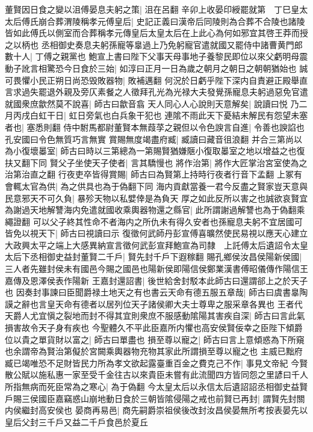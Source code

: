 董賢因日食之變以沮傅晏息夫躬之策|{
	沮在呂翻}
辛卯上收晏印綬罷就第　丁巳皇太太后傅氏崩合葬渭陵稱孝元傅皇后|{
	史記正義曰漢帝后同陵則為合葬不合陵也諸陵皆如此傅氏以側室而合葬稱孝元傳皇后太皇太后在上此心為何如邪宜其啓王莽而授之以柄也}
丞相御史奏息夫躬孫寵等辠過上乃免躬寵官遣就國又罷侍中諸曹黄門郎數十人|{
	丁傅之親黨也}
鮑宣上書曰陛下父事天母事地子養黎民即位以來父虧明母震動子訛言相驚恐今日食於三始|{
	如淳曰正月一日為歲之朝月之朝日之朝朝猶始也}
誠可畏懼小民正朔日尚恐毁敗器物|{
	敗補邁翻}
何況於日虧乎陛下深内自責避正殿舉直言求過失罷退外親及旁仄素餐之人徵拜孔光為光禄大夫發覺孫寵息夫躬過惡免官遣就國衆庶歙然莫不說喜|{
	師古曰歙音翕}
天人同心人心說則天意解矣|{
	說讀曰悦}
乃二月丙戌白虹干日|{
	虹日旁氣也白兵象干犯也}
連隂不雨此天下憂結未解民有怨望未塞者也|{
	塞悉則翻}
侍中駙馬都尉董賢本無葭莩之親但以令色諛言自進|{
	令善也諛諂也孔安國曰令色無質巧言無實}
賞賜無度竭盡府臧|{
	臧讀曰藏音徂浪翻}
并合三第尚以為小復壞㬥室|{
	師古曰時以三第總為一第賜賢猶嫌陿小復取㬥室之地以增益之也復扶又翻下同}
賢父子坐使天子使者|{
	言其驕慢也}
將作治第|{
	將作大匠掌治宮室使為之治第治直之翻}
行夜吏卒皆得賞賜|{
	師古曰為賢第上持時行夜者行音下孟翻}
上冢有會輒太官為供|{
	為之供具也為于偽翻下同}
海内貢獻當養一君今反盡之賢家豈天意與民意邪天不可久負|{
	暴殄天物以私嬖倖是為負天}
厚之如此反所以害之也誠欲哀賢宜為謝過天地解讐海内免遣就國收乘輿器物還之縣官|{
	此所謂謝過解讐也為于偽翻乘繩證翻}
可以父子終其性命不者海内之所仇未有得久安者也孫寵息夫躬不宜居國可皆免以視天下|{
	師古曰視讀曰示}
復徵何武師丹彭宣傅喜曠然使民易視以應天心建立大政興太平之端上大感異納宣言徵何武彭宣拜鮑宣為司隸　上託傅太后遺詔令太皇太后下丞相御史益封董賢二千戶|{
	賢先封千戶下遐稼翻}
賜孔鄉侯汝昌侯陽新侯國|{
	三人者先雖封侯未有國邑今賜之國邑也陽新侯即陽信侯鄭業漢書傅昭儀傳作陽信王嘉傳及恩澤侯表作陽新}
王嘉封還詔書|{
	後世給舍封駁本此師古曰還謂郤上之於天子也}
因奏封事諫曰臣聞爵禄土地天之有也書云天命有德五服五章哉|{
	師古曰虞書辠陶謨之辭也言皇天命有德者以居列位天子諸侯卿大夫士尊卑之服采章各異也}
王者代天爵人尤宜愼之裂地而封不得其宜則衆庶不服感動隂陽其害疾自深|{
	師古曰言此氣損害故令天子身有疾也}
今聖體久不平此臣嘉所内懼也高安侯賢佞幸之臣陛下傾爵位以貴之單貨財以富之|{
	師古曰單盡也}
損至尊以寵之|{
	師古曰言上意傾惑為下所窺也余謂帝為賢治第儗於宮闕乘輿器物充物其家此所謂損至尊以寵之也}
主威已黜府臧已竭唯恐不足財皆民力所為孝文欲起露臺重百金之費克己不作|{
	事見文帝紀}
今賢散公賦以施私惠一家至受千金往古以來貴臣未嘗有此流聞四方皆同怨之里諺曰千人所指無病而死臣常為之寒心|{
	為于偽翻}
今太皇太后以永信太后遺詔詔丞相御史益賢戶賜三侯國臣嘉竊惑山崩地動日食於三朝皆隂侵陽之戒也前賢已再封|{
	謂賢先封關内侯繼封高安侯也}
晏商再易邑|{
	商先嗣爵崇祖侯後改封汝昌侯晏無所考按表晏先以皇后父封三千戶又益二千戶食邑於夏丘}
